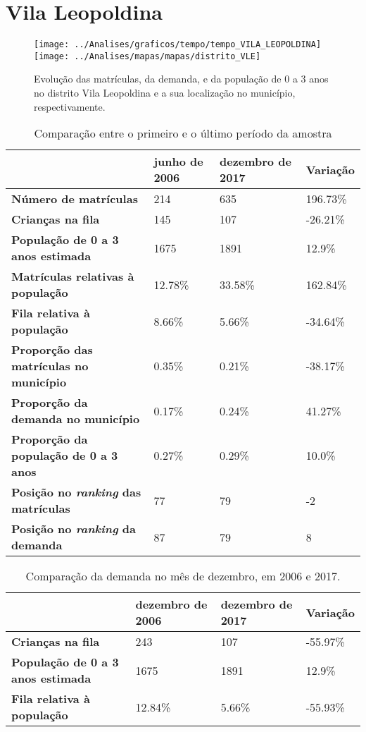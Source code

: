 \section{Vila Leopoldina}
\begin{figure}[H]
\centering
\texttt{[image: ../Analises/graficos/tempo/tempo\_VILA\_LEOPOLDINA]}
\texttt{[image: ../Analises/mapas/mapas/distrito\_VLE]}
\caption{Evolução das matrículas, da demanda, e da população de 0 a 3 anos no distrito Vila Leopoldina e a sua localização no município, respectivamente.}
\end{figure}
\begin{table}[H]
\begin{tabular}{l|l|l|l}
\textbf{}                                      & \textbf{junho de 2006}       & \textbf{dezembro de 2017}    & \textbf{Variação} \\ \hline
\textbf{Número de matrículas}                  & 214 & 635 & 196.73\% \\ \hline
\textbf{Crianças na fila}                      & 145 & 107 & -26.21\% \\ \hline
\textbf{População de 0 a 3 anos estimada}      & 1675 & 1891 & 12.9\% \\ \hline
\textbf{Matrículas relativas à população}      & 12.78\% & 33.58\% & 162.84\% \\ \hline
\textbf{Fila relativa à população}             & 8.66\% & 5.66\% & -34.64\% \\ \hline
\textbf{Proporção das matrículas no município} & 0.35\% & 0.21\% & -38.17\% \\ \hline
\textbf{Proporção da demanda no município}     & 0.17\% & 0.24\% & 41.27\% \\ \hline
\textbf{Proporção da população de 0 a 3 anos}  & 0.27\% & 0.29\% & 10.0\% \\ \hline
\textbf{Posição no \textit{ranking} das matrículas}     & 77 & 79 & -2 \\ \hline
\textbf{Posição no \textit{ranking} da demanda}         & 87 & 79 & 8 \\ 
\end{tabular}
\caption{Comparação entre o primeiro e o último período da amostra}
\end{table}
\begin{table}[H]
\begin{tabular}{l|l|l|l}
\textbf{}                                 & \textbf{dezembro de 2006} & \textbf{dezembro de 2017} & \textbf{Variação} \\ \hline
\textbf{Crianças na fila}                      & 243 & 107 & -55.97\% \\ \hline
\textbf{População de 0 a 3 anos estimada}      & 1675 & 1891 & 12.9\% \\ \hline
\textbf{Fila relativa à população}             & 12.84\% & 5.66\% & -55.93\% \\
\end{tabular}
\caption{Comparação da demanda no mês de dezembro, em 2006 e 2017.}
\end{table}
